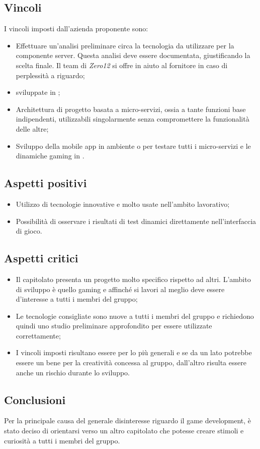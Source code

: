 \subsection{Vincoli}
I vincoli imposti dall'azienda proponente sono:
\begin{itemize}
\item Effettuare un'analisi preliminare circa la tecnologia da utilizzare per la componente server. Questa analisi deve essere documentata, giustificando la scelta finale. Il team di \textit{Zero12} si offre in aiuto al fornitore in caso di perplessità a riguardo;
\item {} sviluppate in ;
\item Architettura di progetto basata a micro-servizi, ossia a tante funzioni base indipendenti, utilizzabili singolarmente senza compromettere la funzionalità delle altre;
\item Sviluppo della mobile app in ambiente  o  per testare tutti i micro-servizi e le dinamiche gaming in . 
\end{itemize}

\subsection{Aspetti positivi}
\begin{itemize}
\item Utilizzo di tecnologie innovative e molto usate nell'ambito lavorativo;
\item Possibilità di osservare i risultati di test dinamici direttamente nell'interfaccia di gioco.
\end{itemize}

\subsection{Aspetti critici}
\begin{itemize}
\item Il capitolato presenta un progetto molto specifico rispetto ad altri. L'ambito di sviluppo è quello gaming e affinché si lavori al meglio deve essere d'interesse a tutti i membri del gruppo;
\item Le tecnologie consigliate sono nuove a tutti i membri del gruppo e richiedono quindi uno studio preliminare approfondito per essere utilizzate correttamente;
\item I vincoli imposti risultano essere per lo più generali e se da un lato potrebbe essere un bene per la creatività concessa al gruppo, dall'altro risulta essere anche un rischio durante lo sviluppo. 
\end{itemize}

\subsection{Conclusioni}
Per la principale causa del generale disinteresse riguardo il game development, è stato deciso di orientarsi verso un altro capitolato che potesse creare stimoli e curiosità a tutti i membri del gruppo.
